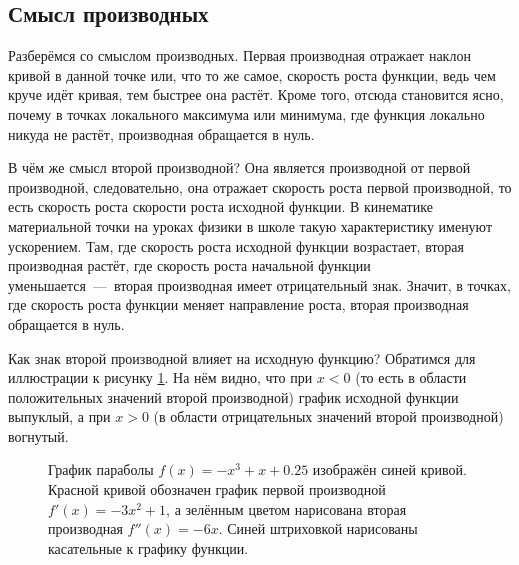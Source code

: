 \documentclass[12pt]{article}
\begin{document}
\subsection{Смысл производных}
Разберёмся со смыслом производных. Первая производная отражает наклон кривой в данной точке или, что то же самое, скорость роста функции, ведь чем круче идёт кривая, тем быстрее она растёт. Кроме того, отсюда становится ясно, почему в точках локального максимума или минимума, где функция локально никуда не растёт, производная обращается в нуль. 

\par В чём же смысл второй производной? Она является производной от первой производной, следовательно, она отражает скорость роста первой производной, то есть скорость роста скорости роста исходной функции. В кинематике материальной точки на уроках физики в школе такую характеристику именуют ускорением. Там, где скорость роста исходной функции возрастает, вторая производная растёт, где скорость роста начальной функции уменьшается~\----~вторая производная имеет отрицательный знак. Значит, в точках, где скорость роста функции меняет направление роста, вторая производная обращается в нуль.

\par Как знак второй производной влияет на исходную функцию? Обратимся для иллюстрации к рисунку \ref{fig:71}. На нём видно, что при $x<0$ (то есть в области положительных значений второй производной) график исходной функции выпуклый, а при $x>0$ (в области отрицательных значений второй производной) вогнутый.

\begin{figure}[htbp]
\centering
{}
\caption{График параболы $f(x) = -x^3 + x + 0.25$ изображён синей кривой. Красной кривой обозначен график первой производной $f'(x) = -3x^2+1$, а зелённым цветом нарисована вторая производная $f''(x) = -6x$. Синей штриховкой нарисованы касательные к графику функции.}
\label{fig:71}
\end{figure}
\end{document}
